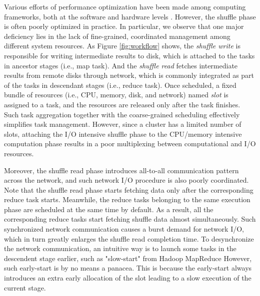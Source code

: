 {\color{blue}
Various efforts of performance optimization have been made among computing frameworks, both at the software and hardware levels \cite{sync, tachyon, heintz2016end, zhang2015prism, cheng2017improving, chen2017heterogeneous, yviquel2018cluster, kaitoua2014hadoop, wasi2017comprehensive}. However, the shuffle phase is often poorly optimized in practice.
}
In particular, we observe that one major deficiency lies in the lack of fine-grained, coordinated management among different system resources.
As Figure \ref{fig:workflow} shows, the \textit{shuffle write} is responsible for writing intermediate results to disk, which is attached to the tasks in ancestor stages (i.e., map task).  
And the \textit{shuffle read} fetches intermediate results from remote disks through network, which is commonly integrated as part of the tasks in descendant stages (i.e., reduce task). 
Once scheduled, a fixed bundle of resources (i.e., CPU, memory, disk, and network) named \textit{slot} is assigned to a task, and the resources are released only after the task finishes.
Such task aggregation together with the coarse-grained scheduling effectively simplifies task management.
However, since a cluster has a limited number of slots, attaching the I/O intensive shuffle phase to the CPU/memory intensive computation phase results in a poor multiplexing between computational and I/O resources.


Moreover, the shuffle read phase introduces all-to-all communication pattern across the network, and such network I/O procedure is also poorly coordinated.
Note that the shuffle read phase starts fetching data only after the corresponding reduce task starts.
Meanwhile, the reduce tasks belonging to the same execution phase are scheduled at the same time by default. 
As a result, all the corresponding reduce tasks start fetching shuffle data almost simultaneously.
Such synchronized network communication causes a burst demand for network I/O, which in turn greatly enlarges the shuffle read completion time. 
To desynchronize the network communication, an intuitive way is to launch some tasks in the descendent stage earlier, such as "slow-start" from Hadoop MapReduce
However, such early-start is by no means a panacea. 
This is because the early-start always introduces an extra early allocation of the slot leading to a slow execution of the current stage.



